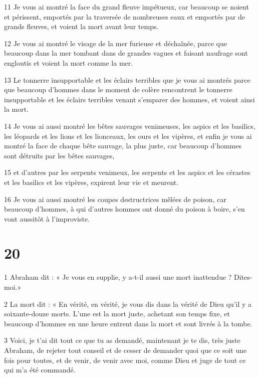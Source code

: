 \par 11 Je vous ai montré la face du grand fleuve impétueux, car beaucoup se noient et périssent, emportés par la traversée de nombreuses eaux et emportés par de grands fleuves, et voient la mort avant leur temps.

\par 12 Je vous ai montré le visage de la mer furieuse et déchaînée, parce que beaucoup dans la mer tombant dans de grandes vagues et faisant naufrage sont engloutis et voient la mort comme la mer.

\par 13 Le tonnerre insupportable et les éclairs terribles que je vous ai montrés parce que beaucoup d'hommes dans le moment de colère rencontrent le tonnerre insupportable et les éclairs terribles venant s'emparer des hommes, et voient ainsi la mort.

\par 14 Je vous ai aussi montré les bêtes sauvages venimeuses, les aspics et les basilics, les léopards et les lions et les lionceaux, les ours et les vipères, et enfin je vous ai montré la face de chaque bête sauvage, la plus juste, car beaucoup d'hommes sont détruits par les bêtes sauvages,

\par 15 et d'autres par les serpents venimeux, les serpents et les aspics et les cérastes et les basilics et les vipères, expirent leur vie et meurent.

\par 16 Je vous ai aussi montré les coupes destructrices mêlées de poison, car beaucoup d'hommes, à qui d'autres hommes ont donné du poison à boire, s'en vont aussitôt à l'improviste.

\chapter{20}

\par 1 Abraham dit : « Je vous en supplie, y a-t-il aussi une mort inattendue ? Dites-moi.»

\par 2 La mort dit : « En vérité, en vérité, je vous dis dans la vérité de Dieu qu'il y a soixante-douze morts. L'une est la mort juste, achetant son temps fixe, et beaucoup d'hommes en une heure entrent dans la mort et sont livrés à la tombe.

\par 3 Voici, je t'ai dit tout ce que tu as demandé, maintenant je te dis, très juste Abraham, de rejeter tout conseil et de cesser de demander quoi que ce soit une fois pour toutes, et de venir, de venir avec moi, comme Dieu et juge de tout ce qui m’a été commandé.

